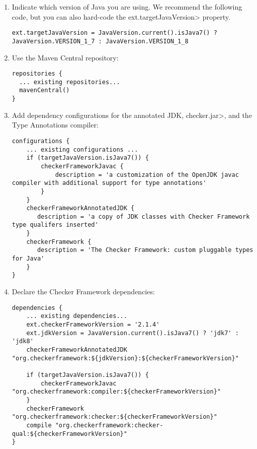 \begin{enumerate}

\item Indicate which version of Java you are using.  We recommend the
  following code, but you can also hard-code the \<ext.targetJavaVersion>
  property.

\begin{mysmall}
\begin{Verbatim}
ext.targetJavaVersion = JavaVersion.current().isJava7() ? JavaVersion.VERSION_1_7 : JavaVersion.VERSION_1_8
\end{Verbatim}
\end{mysmall}

\item Use the Maven Central repository:

\begin{Verbatim}
repositories {
  ... existing repositories...
  mavenCentral()
}
\end{Verbatim}

\item Add dependency configurations for the annotated JDK, \<checker.jar>, and the Type Annotations compiler:

\begin{mysmall}
\begin{Verbatim}
configurations {
    ... existing configurations ...
    if (targetJavaVersion.isJava7()) {
        checkerFrameworkJavac {
            description = 'a customization of the OpenJDK javac compiler with additional support for type annotations'
        }
    }
    checkerFrameworkAnnotatedJDK {
       description = 'a copy of JDK classes with Checker Framework type qualifers inserted'
    }
    checkerFramework {
       description = 'The Checker Framework: custom pluggable types for Java'
    }
}
\end{Verbatim}
\end{mysmall}

\item Declare the Checker Framework dependencies:

\begin{Verbatim}
dependencies {
    ... existing dependencies...
    ext.checkerFrameworkVersion = '2.1.4'
    ext.jdkVersion = JavaVersion.current().isJava7() ? 'jdk7' : 'jdk8'
    checkerFrameworkAnnotatedJDK "org.checkerframework:${jdkVersion}:${checkerFrameworkVersion}"

    if (targetJavaVersion.isJava7()) {
        checkerFrameworkJavac "org.checkerframework:compiler:${checkerFrameworkVersion}"
    }
    checkerFramework "org.checkerframework:checker:${checkerFrameworkVersion}"
    compile "org.checkerframework:checker-qual:${checkerFrameworkVersion}"
}
\end{Verbatim}


\end{enumerate}

